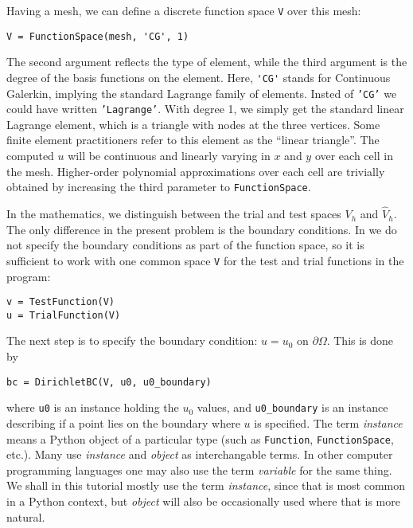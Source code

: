 Having a mesh, we can define a discrete function space {\fontsize{12pt}{12pt}\texttt{V}} over this mesh:
\begin{Verbatim}[fontsize=\fontsize{10pt}{10pt},tabsize=8,baselinestretch=1.05,
fontfamily=tt,xleftmargin=7mm]
V = FunctionSpace(mesh, 'CG', 1)
\end{Verbatim}
\noindent
The second argument reflects the type of element, while the third
argument is the degree of the basis functions on the element.
Here, {\fontsize{12pt}{12pt}\verb!'CG'!} stands
for Continuous Galerkin, implying the 
standard Lagrange family of elements.
Insted of {\fontsize{12pt}{12pt}\texttt{'CG'}} we could have written {\fontsize{12pt}{12pt}\texttt{'Lagrange'}}.
With degree 1, we simply get the standard linear Lagrange element,
which is a triangle 
with nodes at the three vertices. 
Some finite element practitioners refer to this element as the
``linear triangle''.
The computed $u$ will be continuous and linearly varying in $x$ and $y$ over
each cell in the mesh.
Higher-order polynomial approximations over each cell are
trivially obtained by increasing the third parameter to
{\fontsize{12pt}{12pt}\texttt{FunctionSpace}}.

In the mathematics, we distinguish between the trial and test
spaces $V_h$ and $\hat{V}_h$. The only difference in the present problem
is the boundary conditions. In \fenics{} we do not specify the boundary
conditions as part of the function space, so it is sufficient to work
with one common space {\fontsize{12pt}{12pt}\verb!V!} for the test and trial functions in the
program:
\begin{Verbatim}[fontsize=\fontsize{10pt}{10pt},tabsize=8,baselinestretch=1.05,
fontfamily=tt,xleftmargin=7mm]
v = TestFunction(V)
u = TrialFunction(V)
\end{Verbatim}
\noindent

The next step is to specify the boundary condition: $u=u_0$ on
$\partial\Omega$. This is done by
\begin{Verbatim}[fontsize=\fontsize{10pt}{10pt},tabsize=8,baselinestretch=1.05,
fontfamily=tt,xleftmargin=7mm]
bc = DirichletBC(V, u0, u0_boundary)
\end{Verbatim}
\noindent
where {\fontsize{12pt}{12pt}\verb!u0!} is an instance holding the $u_0$ values,
and {\fontsize{12pt}{12pt}\verb!u0_boundary!} is an instance describing if a point lies
on the boundary where $u$ is specified. The term \emph{instance}
means a Python object of a particular type (such as {\fontsize{12pt}{12pt}\texttt{Function}},
{\fontsize{12pt}{12pt}\texttt{FunctionSpace}}, etc.).
Many use \emph{instance} and \emph{object}
as interchangable terms. In other computer programming languages one may
also use the term \emph{variable} for the same thing.
We shall in this tutorial mostly use the term \emph{instance},
since that is most common in a Python context, but \emph{object} will
also be occasionally used where that is more natural.

